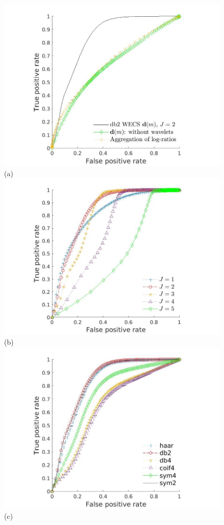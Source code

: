 \documentclass[journal]{IEEEtran}
\begin{document}
\begin{figure}[htp!]
\includegraphics[scale=.13]{../../figs/methods_comparison}\hspace{-.5cm}(a) 
\includegraphics[scale=.13]{../../figs/levels_comparison}\hspace{-.5cm}(b)\\
\includegraphics[scale=.13]{../../figs/families_comparison}\hspace{-.5cm}(c)

\end{figure}
\end{document}
